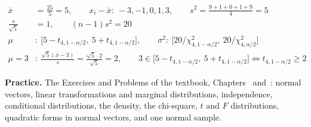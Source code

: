 \documentclass[12pt]{article}
\theoremstyle{definition}
\newcommand{\boardtop}{\vspace*{-\abovedisplayskip}}
\begin{document}
\begin{board}[The data, \(n=5\):]
\boardtop
\begin{align*}
\bar x&=\tfrac{25}5=5,\qquad x_i-\bar x:\ -3,-1,0,1,3,\qquad s^2=\tfrac{9+1+0+1+9}4=5\\
\tfrac s{\sqrt5}&=1,\qquad(n-1)s^2=20\\
\mu&:\ \bigl[5-t_{4,1-\alpha/2},\ 5+t_{4,1-\alpha/2}\bigr],\qquad\sigma^2:\ \bigl[20/\chi^2_{4,1-\alpha/2},\ 20/\chi^2_{4,\alpha/2}\bigr]\\
\mu=3&:\ \frac{\sqrt5(\bar x-3)}s=\frac{\sqrt5\cdot2}{\sqrt5}=2,\qquad3\in\bigl[5-t_{4,1-\alpha/2},\ 5+t_{4,1-\alpha/2}\bigr]
\iff t_{4,1-\alpha/2}\geqslant2
\end{align*}
\end{board}

\bigskip
\textbf{Practice.} The Exercises and Problems of the textbook, Chapters~ and~: normal vectors, linear
transformations and marginal distributions, independence, conditional distributions, the density, the chi-square,
\(t\) and \(F\) distributions, quadratic forms in normal vectors, and one normal sample.
\end{document}

